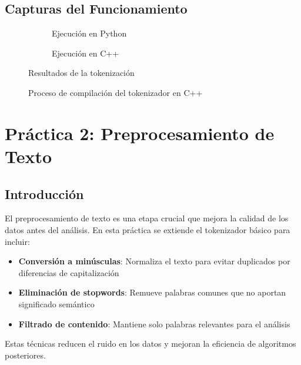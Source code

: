 \documentclass[12pt,a4paper]{article}
\begin{document}
\subsection{Capturas del Funcionamiento}

\begin{figure}[H]
    \centering
    \begin{subfigure}{0.45\textwidth}
        
        \caption{Ejecución en Python}
    \end{subfigure}
    \hfill
    \begin{subfigure}{0.45\textwidth}
        
        \caption{Ejecución en C++}
    \end{subfigure}
    \caption{Resultados de la tokenización}
\end{figure}

\begin{figure}[H]
    \centering
    
    \caption{Proceso de compilación del tokenizador en C++}
\end{figure}

\newpage

\section{Práctica 2: Preprocesamiento de Texto}

\subsection{Introducción}

El preprocesamiento de texto es una etapa crucial que mejora la calidad de los datos antes del análisis. En esta práctica se extiende el tokenizador básico para incluir:

\begin{itemize}
    \item \textbf{Conversión a minúsculas}: Normaliza el texto para evitar duplicados por diferencias de capitalización
    \item \textbf{Eliminación de stopwords}: Remueve palabras comunes que no aportan significado semántico
    \item \textbf{Filtrado de contenido}: Mantiene solo palabras relevantes para el análisis
\end{itemize}

Estas técnicas reducen el ruido en los datos y mejoran la eficiencia de algoritmos posteriores.
\end{document}
